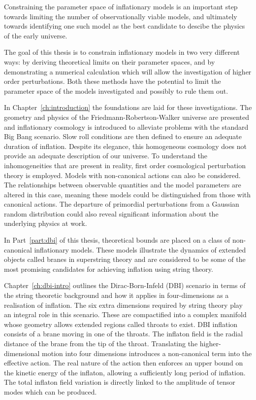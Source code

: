 Constraining the parameter space of inflationary models is an important step
towards limiting the number of observationally viable models, and ultimately
towards identifying one such model as the best candidate to descibe the
physics of the early
universe. 

The goal of this thesis is to constrain inflationary models in two very different
ways: by deriving theoretical limits on their parameter spaces, and by demonstrating
a numerical calculation which will allow the investigation of higher order
perturbations. Both these methods have the potential to limit the
parameter space of the models investigated and possibly to rule them out.


In Chapter~\ref{ch:introduction} the foundations are laid for these investigations.
The geometry and physics of the Friedmann-Robertson-Walker universe are presented and
inflationary cosmology is introduced to alleviate problems with the standard Big
Bang scenario. Slow roll conditions are then defined to ensure an adequate duration
of inflation. Despite its elegance, this homogeneous cosmology does not provide an
adequate description of our universe. To understand the inhomogeneities that
are present in reality, first order
cosmological perturbation theory is employed. Models with non-canonical
actions can also be considered. The relationships between observable quantities and
the model parameters are altered in this case, meaning these models could be
distinguished from those with canonical actions. The departure of primordial
perturbations from a Gaussian random distribution could also reveal significant
information about the underlying physics at work.


In Part~\ref{part:dbi} of this thesis, theoretical bounds are placed on a class of
non-canonical inflationary models. These models illustrate the dynamics of
extended objects called branes in superstring theory and are considered to be some of
the most promising candidates for achieving inflation using string theory.

Chapter~\ref{ch:dbi-intro} outlines the Dirac-Born-Infeld (DBI) scenario in
terms of the string theoretic background and how it applies in four-dimensions
as a realisation of inflation. The six extra dimensions required by string theory
play an integral role in this scenario. These are compactified into a complex
manifold whose geometry allows extended regions called throats to exist. DBI
inflation consists of a brane moving in one of the throats. The inflaton field is
the radial distance of the brane from the tip of the throat. Translating the
higher-dimensional motion into four dimensions introduces a non-canonical term into
the
effective action. The real nature of the action then enforces an upper bound on the
kinetic energy of the inflaton, allowing a sufficiently long period of inflation. The
total inflaton field variation is directly linked to the
amplitude of tensor modes which can be produced.


